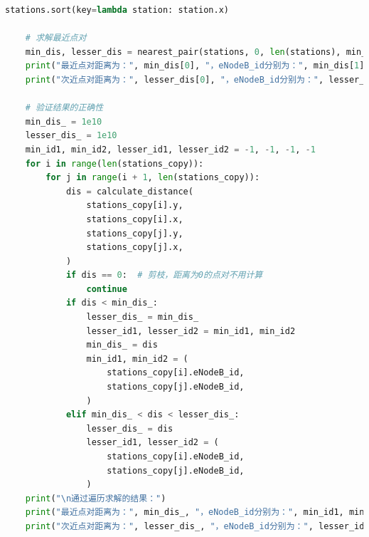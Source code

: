 \documentclass[lang=cn,11pt,a4paper]{elegantpaper}
\begin{document}
\begin{lstlisting}[language=python]
    stations.sort(key=lambda station: station.x)

    # 求解最近点对
    min_dis, lesser_dis = nearest_pair(stations, 0, len(stations), min_dis, lesser_dis)
    print("最近点对距离为：", min_dis[0], "，eNodeB_id分别为：", min_dis[1], min_dis[2])
    print("次近点对距离为：", lesser_dis[0], "，eNodeB_id分别为：", lesser_dis[1], lesser_dis[2])

    # 验证结果的正确性
    min_dis_ = 1e10
    lesser_dis_ = 1e10
    min_id1, min_id2, lesser_id1, lesser_id2 = -1, -1, -1, -1
    for i in range(len(stations_copy)):
        for j in range(i + 1, len(stations_copy)):
            dis = calculate_distance(
                stations_copy[i].y,
                stations_copy[i].x,
                stations_copy[j].y,
                stations_copy[j].x,
            )
            if dis == 0:  # 剪枝，距离为0的点对不用计算
                continue
            if dis < min_dis_:
                lesser_dis_ = min_dis_
                lesser_id1, lesser_id2 = min_id1, min_id2
                min_dis_ = dis
                min_id1, min_id2 = (
                    stations_copy[i].eNodeB_id,
                    stations_copy[j].eNodeB_id,
                )
            elif min_dis_ < dis < lesser_dis_:
                lesser_dis_ = dis
                lesser_id1, lesser_id2 = (
                    stations_copy[i].eNodeB_id,
                    stations_copy[j].eNodeB_id,
                )
    print("\n通过遍历求解的结果：")
    print("最近点对距离为：", min_dis_, "，eNodeB_id分别为：", min_id1, min_id2)
    print("次近点对距离为：", lesser_dis_, "，eNodeB_id分别为：", lesser_id1, lesser_id2)

\end{lstlisting}




\end{document}
